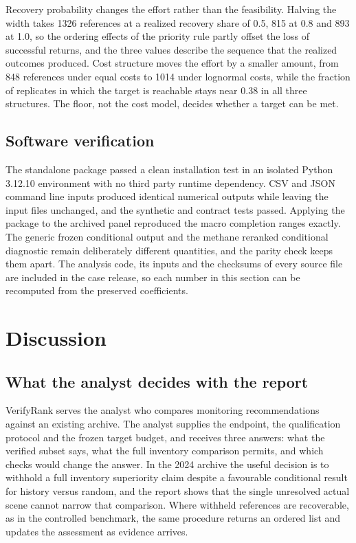 \documentclass[a4paper,fleqn,longmktitle]{cas-sc}
\begin{document}
Recovery probability changes the effort rather than the feasibility. Halving the width takes 1326 references at a realized recovery share of 0.5, 815 at 0.8 and 893 at 1.0, so the ordering effects of the priority rule partly offset the loss of successful returns, and the three values describe the sequence that the realized outcomes produced. Cost structure moves the effort by a smaller amount, from 848 references under equal costs to 1014 under lognormal costs, while the fraction of replicates in which the target is reachable stays near 0.38 in all three structures. The floor, not the cost model, decides whether a target can be met.

\subsection{Software verification}\label{sec:software}

The standalone package passed a clean installation test in an isolated Python 3.12.10 environment with no third party runtime dependency. CSV and JSON command line inputs produced identical numerical outputs while leaving the input files unchanged, and the synthetic and contract tests passed. Applying the package to the archived panel reproduced the macro completion ranges exactly. The generic frozen conditional output and the methane reranked conditional diagnostic remain deliberately different quantities, and the parity check keeps them apart. The analysis code, its inputs and the checksums of every source file are included in the case release, so each number in this section can be recomputed from the preserved coefficients.

\section{Discussion}\label{sec:discussion}

\subsection{What the analyst decides with the report}\label{sec:gain}

VerifyRank serves the analyst who compares monitoring recommendations against an existing archive. The analyst supplies the endpoint, the qualification protocol and the frozen target budget, and receives three answers: what the verified subset says, what the full inventory comparison permits, and which checks would change the answer. In the 2024 archive the useful decision is to withhold a full inventory superiority claim despite a favourable conditional result for history versus random, and the report shows that the single unresolved actual scene cannot narrow that comparison. Where withheld references are recoverable, as in the controlled benchmark, the same procedure returns an ordered list and updates the assessment as evidence arrives.
\end{document}
